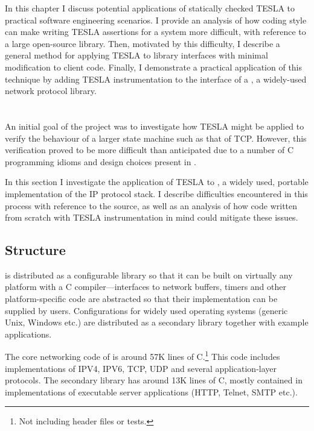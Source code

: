 In this chapter I discuss potential applications of statically checked TESLA to
practical software engineering scenarios. I provide an analysis of how coding
style can make writing TESLA assertions for a system more difficult, with
reference to a large open-source library. Then, motivated by this difficulty, I
describe a general method for applying TESLA to library interfaces with minimal
modification to client code. Finally, I demonstrate a practical application of
this technique by adding TESLA instrumentation to the interface of a \lwip{}, a
widely-used network protocol library.

\section{\lwip{}} \label{sec:lwip}

An initial goal of the project was to investigate how TESLA might be
applied to verify the behaviour of a larger state machine such as that
of TCP. However, this verification proved to be more difficult than
anticipated due to a number of C programming idioms and design choices present
in \lwip{}.

In this section I investigate the application of TESLA to \lwip{}
\cite{dunkels_design_2001}, a widely used, portable implementation of
the IP protocol stack. I describe difficulties encountered in this
process with reference to the \lwip{} source, as well as an analysis of how
code written from scratch with TESLA instrumentation in mind could
mitigate these issues.

\subsection{Structure}

\lwip{} is distributed as a configurable library so that it can be built on
virtually any platform with a C compiler---interfaces to network
buffers, timers and other platform-specific code are abstracted so that
their implementation can be supplied by users. Configurations for
widely used operating systems (generic Unix, Windows etc.) are
distributed as a secondary library together with example applications.

The core networking code of \lwip{} is around 57K lines of C.\footnote{Not
including header files or tests.} This code includes implementations of IPV4,
IPV6, TCP, UDP and several application-layer protocols. The secondary library
has around 13K lines of C, mostly contained in implementations of executable
server applications (HTTP, Telnet, SMTP etc.).

